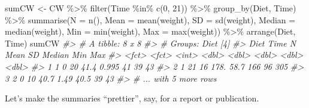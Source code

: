 \documentclass[
  14pt,
]{memoir}
\newenvironment{Shaded}{\begin{snugshade}}{\end{snugshade}}
\newcommand{\AttributeTok}[1]{\textcolor[rgb]{0.77,0.63,0.00}{#1}}
\newcommand{\CommentTok}[1]{\textcolor[rgb]{0.56,0.35,0.01}{\textit{#1}}}
\newcommand{\DecValTok}[1]{\textcolor[rgb]{0.00,0.00,0.81}{#1}}
\newcommand{\FunctionTok}[1]{\textcolor[rgb]{0.00,0.00,0.00}{#1}}
\newcommand{\NormalTok}[1]{#1}
\newcommand{\OtherTok}[1]{\textcolor[rgb]{0.56,0.35,0.01}{#1}}
\newcommand{\SpecialCharTok}[1]{\textcolor[rgb]{0.00,0.00,0.00}{#1}}
\begin{document}
\begin{Shaded}
\begin{Highlighting}[]
\NormalTok{sumCW }\OtherTok{\textless{}{-}}\NormalTok{  CW }\SpecialCharTok{\%\textgreater{}\%} 
  \FunctionTok{filter}\NormalTok{(Time }\SpecialCharTok{\%in\%} \FunctionTok{c}\NormalTok{(}\DecValTok{0}\NormalTok{, }\DecValTok{21}\NormalTok{)) }\SpecialCharTok{\%\textgreater{}\%} 
  \FunctionTok{group\_by}\NormalTok{(Diet, Time) }\SpecialCharTok{\%\textgreater{}\%} 
  \FunctionTok{summarise}\NormalTok{(}\AttributeTok{N =} \FunctionTok{n}\NormalTok{(),}
            \AttributeTok{Mean =} \FunctionTok{mean}\NormalTok{(weight),}
            \AttributeTok{SD =} \FunctionTok{sd}\NormalTok{(weight),}
            \AttributeTok{Median =} \FunctionTok{median}\NormalTok{(weight),}
            \AttributeTok{Min =} \FunctionTok{min}\NormalTok{(weight),}
            \AttributeTok{Max =} \FunctionTok{max}\NormalTok{(weight)) }\SpecialCharTok{\%\textgreater{}\%} 
  \FunctionTok{arrange}\NormalTok{(Diet, Time)}
\NormalTok{sumCW}
\CommentTok{\#\textgreater{} \# A tibble: 8 x 8}
\CommentTok{\#\textgreater{} \# Groups:   Diet [4]}
\CommentTok{\#\textgreater{}   Diet  Time      N  Mean     SD Median   Min   Max}
\CommentTok{\#\textgreater{}   \textless{}fct\textgreater{} \textless{}fct\textgreater{} \textless{}int\textgreater{} \textless{}dbl\textgreater{}  \textless{}dbl\textgreater{}  \textless{}dbl\textgreater{} \textless{}dbl\textgreater{} \textless{}dbl\textgreater{}}
\CommentTok{\#\textgreater{} 1 1     0        20  41.4  0.995   41      39    43}
\CommentTok{\#\textgreater{} 2 1     21       16 178.  58.7    166      96   305}
\CommentTok{\#\textgreater{} 3 2     0        10  40.7  1.49    40.5    39    43}
\CommentTok{\#\textgreater{} \# ... with 5 more rows}
\end{Highlighting}
\end{Shaded}

Let's make the summaries ``prettier'', say, for a report or publication.
\end{document}
